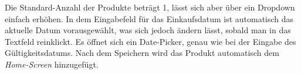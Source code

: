 Die Standard-Anzahl der Produkte beträgt 1, lässt sich aber über ein Dropdown einfach erhöhen. In dem Eingabefeld für das Einkaufsdatum ist automatisch das aktuelle Datum vorausgewählt, was sich jedoch ändern lässt, sobald man in das Textfeld reinklickt. Es öffnet sich ein Date-Picker, genau wie bei der Eingabe des Gültigkeitsdatums. Nach dem Speichern wird das Produkt automatisch dem \textit{Home-Screen} hinzugefügt.



